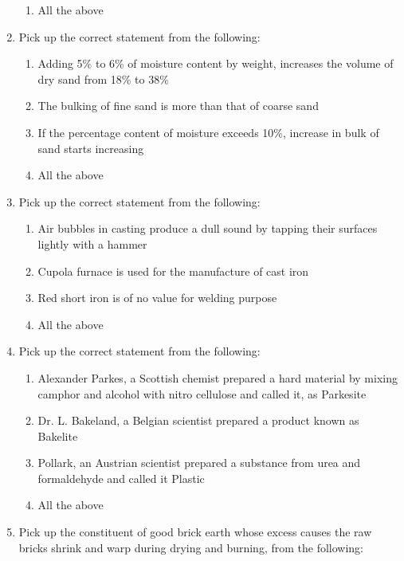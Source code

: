 \documentclass[11pt,a4paper]{article}
\begin{document}
\begin{enumerate}
\begin{enumerate}[label=\Alph*.]
\item{All the above}
\end{enumerate}
\item{Pick up the correct statement from the following:}
\begin{enumerate}[label=\Alph*.]
\item{Adding 5\% to 6\% of moisture content by weight, increases the volume of dry sand from 18\% to 38\%}
\item{The bulking of fine sand is more than that of coarse sand}
\item{If the percentage content of moisture exceeds 10\%, increase in bulk of sand starts increasing}
\item{All the above}
\end{enumerate}
\item{Pick up the correct statement from the following:}
\begin{enumerate}[label=\Alph*.]
\item{Air bubbles in casting produce a dull sound by tapping their surfaces lightly with a hammer}
\item{Cupola furnace is used for the manufacture of cast iron}
\item{Red short iron is of no value for welding purpose}
\item{All the above}
\end{enumerate}
\item{Pick up the correct statement from the following:}
\begin{enumerate}[label=\Alph*.]
\item{Alexander Parkes, a Scottish chemist prepared a hard material by mixing camphor and alcohol with nitro cellulose and called it, as Parkesite}
\item{Dr. L. Bakeland, a Belgian scientist prepared a product known as Bakelite}
\item{Pollark, an Austrian scientist prepared a substance from urea and formaldehyde and called it Plastic}
\item{All the above}
\end{enumerate}
\item{Pick up the constituent of good brick earth whose excess causes the raw bricks shrink and warp during drying and burning, from the following:}
\\
\end{enumerate}
\end{document}
